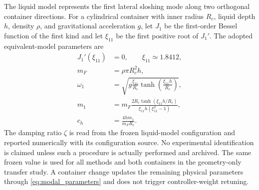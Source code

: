 The liquid model represents the first lateral sloshing mode along two
orthogonal container directions. For a cylindrical container with inner radius
\(R_c\), liquid depth \(h\), density \(\rho\), and gravitational acceleration
\(g\), let \(J_1\) be the first-order Bessel function of the first kind and let
\(\xi_{11}\) be the first positive root of \(J_1'\). The adopted
equivalent-model parameters are \cite{A01_Leva2021,A02_Guagliumi2021}
\begin{equation}
\begin{aligned}
  J_1'(\xi_{11})&=0,\qquad \xi_{11}\simeq1.8412,\\
  m_F&=\rho\pi R_c^2h,\\
  \omega_1&=
  \sqrt{g\frac{\xi_{11}}{R_c}
  \tanh\!\left(\frac{\xi_{11}h}{R_c}\right)},\\
  m_1&=m_F
  \frac{2R_c\tanh(\xi_{11}h/R_c)}
  {\xi_{11}h(\xi_{11}^2-1)},\\
  c_h&=\frac{4hm_1}{m_FR_c}.
\end{aligned}
\label{eq:modal_parameters}
\end{equation}
The damping ratio $\zeta$ is read from the frozen liquid-model configuration and reported numerically with its configuration source. No experimental identification is claimed unless such a procedure is actually performed and archived. The same frozen value is used for all methods and both containers in the geometry-only transfer study. A container change updates the remaining physical parameters through \cref{eq:modal_parameters} and does not trigger controller-weight retuning.


